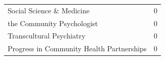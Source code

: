 \documentclass[]{tufte-handout}
\begin{document}
\begin{longtable}[]{@{}ll@{}}
\begin{minipage}[t]{0.68\columnwidth}\raggedright\strut
Social Science \& Medicine\strut
\end{minipage} & \begin{minipage}[t]{0.21\columnwidth}\raggedright\strut
0\strut
\end{minipage}\tabularnewline
\begin{minipage}[t]{0.68\columnwidth}\raggedright\strut
the Community Psychologist\strut
\end{minipage} & \begin{minipage}[t]{0.21\columnwidth}\raggedright\strut
0\strut
\end{minipage}\tabularnewline
\begin{minipage}[t]{0.68\columnwidth}\raggedright\strut
Transcultural Psychiatry\strut
\end{minipage} & \begin{minipage}[t]{0.21\columnwidth}\raggedright\strut
0\strut
\end{minipage}\tabularnewline
\begin{minipage}[t]{0.68\columnwidth}\raggedright\strut
Progress in Community Health Partnerships\strut
\end{minipage} & \begin{minipage}[t]{0.21\columnwidth}\raggedright\strut
0\strut
\end{minipage}\tabularnewline
\bottomrule
\end{longtable}

\newpage
\end{document}
